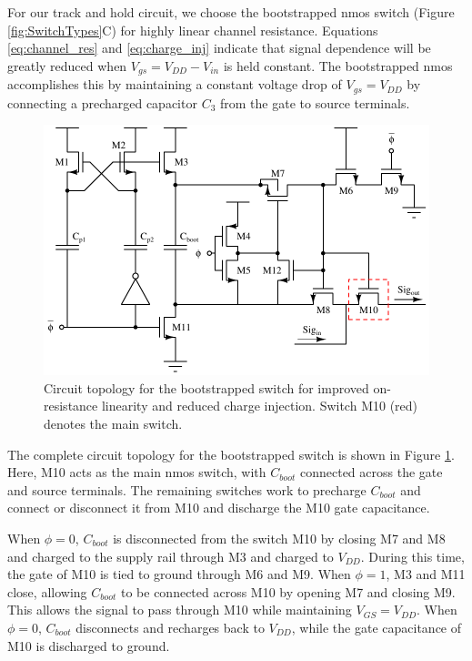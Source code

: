 \documentclass[10pt,journal]{IEEEtran}\usepackage{longtable}
\begin{document}
For our track and hold circuit, we choose the bootstrapped nmos switch (Figure \ref{fig:SwitchTypes}C) for highly linear channel resistance. Equations \ref{eq:channel_res} and \ref{eq:charge_inj} indicate that signal dependence will be greatly reduced when $V_{gs}=V_{DD}-V_{in}$ is held constant. The bootstrapped nmos accomplishes this by maintaining a constant voltage drop of $V_{gs}=V_{DD}$ by connecting a precharged capacitor $C_3$ from the gate to source terminals. 
\begin{figure}[tbph]
\begin{center}
\includegraphics[width=1\columnwidth]{BootstrappedSwitch.pdf}
\caption{Circuit topology for the bootstrapped switch for improved on-resistance linearity and reduced charge injection. Switch M10 (red) denotes the main switch.}
\label{fig:BootstrappedSwitch}
\end{center}
\end{figure}
The complete circuit topology for the bootstrapped switch is shown in Figure \ref{fig:BootstrappedSwitch}. Here, M10 acts as the main nmos switch, with $C_{boot}$ connected across the gate and source terminals. The remaining switches work to precharge $C_{boot}$ and connect or disconnect it from M10 and discharge the M10 gate capacitance.

When $\phi=0$, $C_{boot}$ is disconnected from the  switch M10 by closing M7 and M8 and charged to the supply rail through M3 and charged to $V_{DD}$. During this time, the gate of M10 is tied to ground through M6 and M9. When $\phi=1$, M3 and M11 close, allowing $C_{boot}$ to be connected across M10 by opening M7 and closing M9. This allows the signal to pass through M10 while maintaining $V_{GS}=V_{DD}$. When $\phi=0$, $C_{boot}$ disconnects and recharges back to $V_{DD}$, while the gate capacitance of M10 is discharged to ground.
\end{document}
